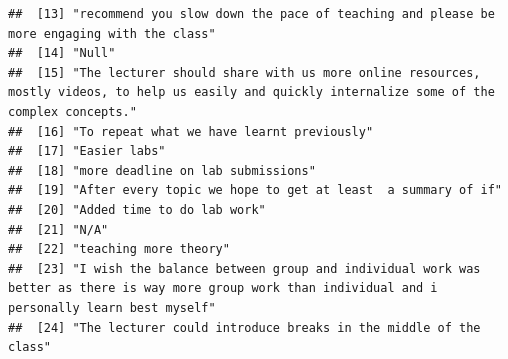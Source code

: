 \documentclass[
]{article}
\begin{document}
\begin{verbatim}
##  [13] "recommend you slow down the pace of teaching and please be more engaging with the class"                                                                                                                               
##  [14] "Null"                                                                                                                                                                                                                  
##  [15] "The lecturer should share with us more online resources, mostly videos, to help us easily and quickly internalize some of the complex concepts."                                                                       
##  [16] "To repeat what we have learnt previously"                                                                                                                                                                              
##  [17] "Easier labs"                                                                                                                                                                                                           
##  [18] "more deadline on lab submissions"                                                                                                                                                                                      
##  [19] "After every topic we hope to get at least  a summary of if"                                                                                                                                                            
##  [20] "Added time to do lab work"                                                                                                                                                                                             
##  [21] "N/A"                                                                                                                                                                                                                   
##  [22] "teaching more theory"                                                                                                                                                                                                  
##  [23] "I wish the balance between group and individual work was better as there is way more group work than individual and i personally learn best myself"                                                                    
##  [24] "The lecturer could introduce breaks in the middle of the class"                                                                                                                                                        

\end{verbatim}
\end{document}
